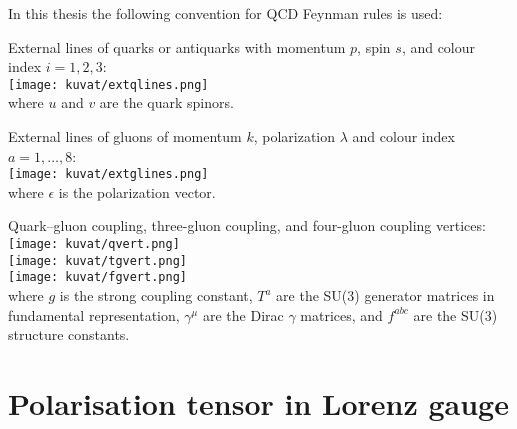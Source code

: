 \documentclass[a4paper, twoside, english, 12pt]{report}
\begin{document}
In this thesis the following convention for QCD Feynman rules \cite{pqcd,Peskin,risto} is used:

External lines of quarks or antiquarks with momentum $p$, spin $s$, and colour index $i=1,2,3$:\\
\texttt{[image: kuvat/extqlines.png]}\\
where $u$ and $v$ are the quark spinors.

External lines of gluons of momentum $k$, polarization $\lambda$ and colour index $a=1,\ldots,8$:\\
\texttt{[image: kuvat/extglines.png]}\\
where $\epsilon$ is the polarization vector.

Quark--gluon coupling, three-gluon coupling, and four-gluon coupling vertices:\\
\texttt{[image: kuvat/qvert.png]}\\
\texttt{[image: kuvat/tgvert.png]}\\
\texttt{[image: kuvat/fgvert.png]}\\
where $g$ is the strong coupling constant, $T^a$ are the SU(3) generator matrices in fundamental representation, $\gamma^\mu$ are the Dirac $\gamma$ matrices, and $f^{abc}$ are the SU(3) structure constants.

\clearpage
\section{Polarisation tensor in Lorenz gauge}\label{AS:cov_polarization_tensor}
\end{document}
